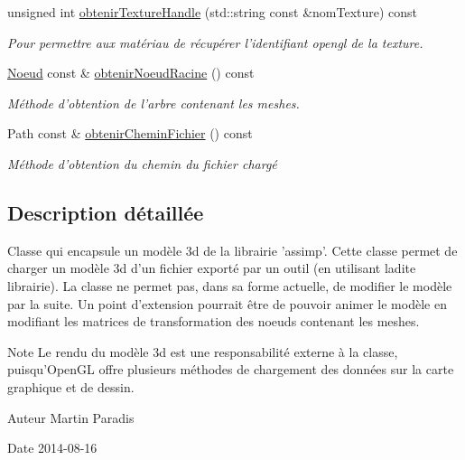 \begin{DoxyCompactItemize}
unsigned int \hyperlink{classmodele_1_1_modele3_d_a12d8fa87d7b2087866ea81af511041f4}{obtenir\-Texture\-Handle} (std\-::string const \&nom\-Texture) const 
\begin{DoxyCompactList}\small\item\em Pour permettre aux matériau de récupérer l'identifiant opengl de la texture. \end{DoxyCompactList}\item 
\hyperlink{classmodele_1_1_noeud}{Noeud} const \& \hyperlink{classmodele_1_1_modele3_d_af4d5e0bd8b91af3195086dda8fe019e3}{obtenir\-Noeud\-Racine} () const 
\begin{DoxyCompactList}\small\item\em Méthode d'obtention de l'arbre contenant les meshes. \end{DoxyCompactList}\item 
Path const \& \hyperlink{classmodele_1_1_modele3_d_ad175907ab5ce7898958ad42008db7869}{obtenir\-Chemin\-Fichier} () const 
\begin{DoxyCompactList}\small\item\em Méthode d'obtention du chemin du fichier chargé \end{DoxyCompactList}\end{DoxyCompactItemize}


\subsection{Description détaillée}
Classe qui encapsule un modèle 3d de la librairie 'assimp'. Cette classe permet de charger un modèle 3d d'un fichier exporté par un outil (en utilisant ladite librairie). La classe ne permet pas, dans sa forme actuelle, de modifier le modèle par la suite. Un point d'extension pourrait être de pouvoir animer le modèle en modifiant les matrices de transformation des noeuds contenant les meshes. 

\begin{DoxyNote}{Note}
Le rendu du modèle 3d est une responsabilité externe à la classe, puisqu'Open\-G\-L offre plusieurs méthodes de chargement des données sur la carte graphique et de dessin.
\end{DoxyNote}
\begin{DoxyAuthor}{Auteur}
Martin Paradis 
\end{DoxyAuthor}
\begin{DoxyDate}{Date}
2014-\/08-\/16 
\end{DoxyDate}


